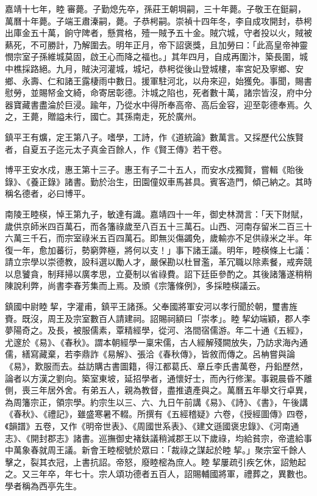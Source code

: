 嘉靖十七年，睦審薨。子勤熄先卒，孫莊王朝堈嗣，三十年薨。子敬王在鋌嗣，萬曆十年薨。子端王肅溱嗣，薨。子恭枵嗣。崇禎十四年冬，李自成攻開封，恭枵出庫金五十萬，餉守陴者，懸賞格，殪一賊予五十金。賊穴城，守者投以火，賊被爇死，不可勝計，乃解圍去。明年正月，帝下詔褒獎，且加勞曰：「此高皇帝神靈憫宗室子孫維城莫固，啟王心而降之福也。」其年四月，自成再圍汴，築長圍，城中樵採路絕。九月，賊決河灌城，城圮，恭枵從後山登城樓，率宮妃及寧鄉、安鄉、永壽、仁和諸王露棲雨中數日。援軍駐河北，以舟來迎，始獲免。事聞，賜書慰勞，並賜帑金文綺，命寄居彰德。汴城之陷也，死者數十萬，諸宗皆沒，府中分器寶藏書盡淪於巨浸。踰年，乃從水中得所奉高帝、高后金容，迎至彰德奉焉。久之，王薨，贈謚未行，國亡。其孫南走，死於廣州。

鎮平王有爌，定王第八子。嗜學，工詩，作《道統論》數萬言。又採歷代公族賢者，自夏五子迄元太子真金百餘人，作《賢王傳》若干卷。

博平王安水戍，惠王第十三子。惠王有子二十五人，而安水戍獨賢，嘗輯《貽後錄》、《養正錄》諸書。勤於治生，田園僮奴車馬甚具。賓客造門，傾己納之。其時稱名德者，必曰博平。

南陵王睦楧，悼王第九子，敏達有識。嘉靖四十一年，御史林潤言：「天下財賦，歲供京師米四百萬石，而各籓祿歲至八百五十三萬石。山西、河南存留米二百三十六萬三千石，而宗室祿米五百四萬石。即無災傷蠲免，歲輸亦不足供祿米之半。年復一年，愈加蕃衍，勢窮弊極，將何以支！」事下諸王議。明年，睦楧條上七議：請立宗學以崇德教，設科選以勵人才，嚴保勘以杜冒濫，革冗職以除素餐，戒奔競以息饕貪，制拜掃以廣孝思，立憂制以省祿費。詔下廷臣參酌之。其後諸籓遂稍稍陳說利弊，尚書李春芳集而上焉。及頒《宗籓條例》，多採睦楧議云。

鎮國中尉睦挈，字灌甫，鎮平王諸孫。父奉國將軍安河以孝行聞於朝，璽書旌賚。既沒，周王及宗室數百人請建祠。詔賜祠額曰「崇孝」。睦挈幼端穎，郡人李夢陽奇之。及長，被服儒素，覃精經學，從河、洛間宿儒游。年二十通《五經》，尤邃於《易》、《春秋》。謂本朝經學一稟宋儒，古人經解殘闕放失，乃訪求海內通儒，繕寫藏棄，若李鼎詐《易解》、張洽《春秋傳》，皆敘而傳之。呂柟嘗與論《易》，歎服而去。益訪購古書圖籍，得江都葛氏、章丘李氏書萬卷，丹鉛歷然，論者以方漢之劉向。築室東坡，延招學者，通懷好士，而內行修潔。事親晨昏不離側，喪三年居外舍。有弟五人，親為教督，盡推遺產與之。萬曆五年舉文行卓異，為周籓宗正，領宗學。約宗生以三、六、九日午前講《易》、《詩》、《書》，午後講《春秋》、《禮記》，雖盛寒暑不輟。所撰有《五經稽疑》六卷，《授經圖傳》四卷，《韻譜》五卷，又作《明帝世表》、《周國世系表》、《建文遜國褒忠錄》、《河南通志》、《開封郡志》諸書。巡撫御史褚鈇議稍減郡王以下歲祿，均給貧宗，帝遣給事中萬象春就周王議。新會王睦樒號於眾曰：「裁祿之謀起於睦挈。」聚宗室千餘人擊之，裂其衣冠，上書抗詔。帝怒，廢睦樒為庶人。睦挈屢疏引疾乞休，詔勉起之。又三年卒，年七十。宗人頌功德者五百人，詔賜輔國將軍，禮葬之，異數也。學者稱為西亭先生。

